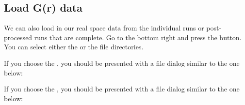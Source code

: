 \noindent{}

\subsection{Load G(r) data}
We can also load in our real space data from the individual runs or post-processed runs that are complete.  Go to the bottom right and press the  button. You can select either the  or the  file directories. 

If you choose the , you should be presented with a file dialog similar to the one below:

\noindent{}

If you choose the , you should be presented with a file dialog similar to the one below:

\noindent{}

